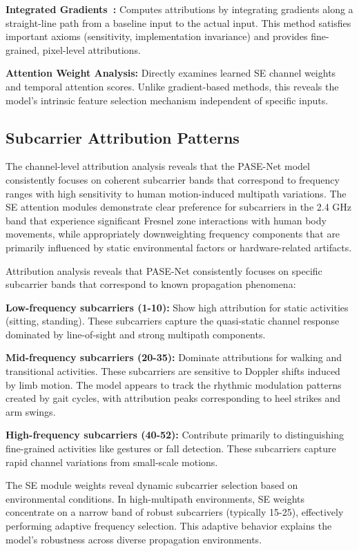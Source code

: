 \documentclass[lettersize,journal]{IEEEtran}
\begin{document}
\textbf{Integrated Gradients~\cite{sundararajan2017ig}:} Computes attributions by integrating gradients along a straight-line path from a baseline input to the actual input. This method satisfies important axioms (sensitivity, implementation invariance) and provides fine-grained, pixel-level attributions.

\textbf{Attention Weight Analysis:} Directly examines learned SE channel weights and temporal attention scores. Unlike gradient-based methods, this reveals the model's intrinsic feature selection mechanism independent of specific inputs.

\subsection{Subcarrier Attribution Patterns}

The channel-level attribution analysis reveals that the PASE-Net model consistently focuses on coherent subcarrier bands that correspond to frequency ranges with high sensitivity to human motion-induced multipath variations. The SE attention modules demonstrate clear preference for subcarriers in the 2.4 GHz band that experience significant Fresnel zone interactions with human body movements, while appropriately downweighting frequency components that are primarily influenced by static environmental factors or hardware-related artifacts.

Attribution analysis reveals that PASE-Net consistently focuses on specific subcarrier bands that correspond to known propagation phenomena:

\textbf{Low-frequency subcarriers (1-10):} Show high attribution for static activities (sitting, standing). These subcarriers capture the quasi-static channel response dominated by line-of-sight and strong multipath components.

\textbf{Mid-frequency subcarriers (20-35):} Dominate attributions for walking and transitional activities. These subcarriers are sensitive to Doppler shifts induced by limb motion. The model appears to track the rhythmic modulation patterns created by gait cycles, with attribution peaks corresponding to heel strikes and arm swings.

\textbf{High-frequency subcarriers (40-52):} Contribute primarily to distinguishing fine-grained activities like gestures or fall detection. These subcarriers capture rapid channel variations from small-scale motions.

The SE module weights reveal dynamic subcarrier selection based on environmental conditions. In high-multipath environments, SE weights concentrate on a narrow band of robust subcarriers (typically 15-25), effectively performing adaptive frequency selection. This adaptive behavior explains the model's robustness across diverse propagation environments.
\end{document}
